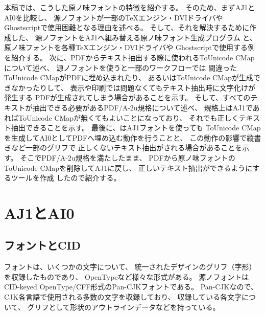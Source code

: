 本稿では、こうした原ノ味フォントの特徴を紹介する。
そのため、まずAJ1とAI0を比較し、
源ノフォントが一部の\TeX エンジン・DVIドライバや
Ghostscriptで使用困難となる理由を述べる。
そして、それを解決するために作成した、
源ノフォントをAJ1へ組み替える原ノ味フォント生成プログラム
\cite{haranoaji-generator}と、
原ノ味フォントを各種\TeX エンジン・DVIドライバや
Ghostscriptで使用する例を紹介する。
次に、PDFからテキスト抽出する際に使われるToUnicode CMapについて述べ、
源ノフォントを使うと一部のワークフローでは
間違ったToUnicode CMapがPDFに埋め込まれたり、
あるいはToUnicode CMapが生成できなかったりして、
表示や印刷では問題なくてもテキスト抽出時に文字化けが発生する
PDFが生成されてしまう場合があることを示す。
そして、すべてのテキストが抽出できる必要があるPDF/A-2u規格について述べ、
規格上はAJ1であればToUnicode CMapが無くてもよいことになっており、
それでも正しくテキスト抽出できることを示す。
最後に、\LuaTeX はAJ1フォントを使っても
ToUnicode CMapを生成してAI0としてPDFへ埋め込む動作を行うことと、
この動作の影響で縦書きなど一部のグリフで
正しくないテキスト抽出がされる場合があることを示す。
そこでPDF/A-2u規格を満たしたまま、
PDFから原ノ味フォントのToUnicode CMapを削除してAJ1に戻し、
正しいテキスト抽出ができるようにするツールを作成
\cite{pdf-rm-tuc}したので紹介する。

\section{AJ1とAI0}

\subsection{フォントとCID}

フォントは、いくつかの文字について、
統一されたデザインのグリフ（字形）を収録したものであり、
OpenTypeなど様々な形式がある。
源ノフォント\cite{sourcehanserif}\cite{sourcehansans}は
CID-keyed OpenType/CFF形式のPan-CJKフォントである。
Pan-CJKなので、
CJK各言語で使用される多数の文字を収録しており、
収録している各文字について、
グリフとして形状のアウトラインデータなどを持っている。

